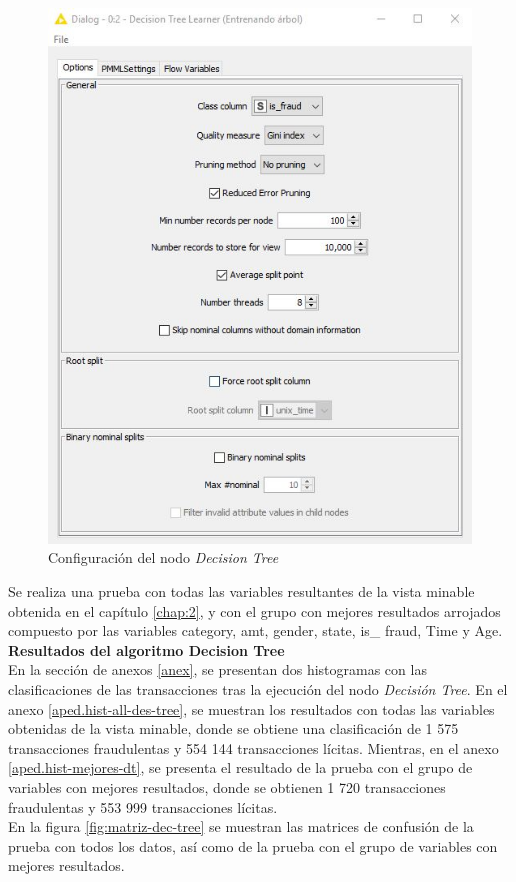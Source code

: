 \begin{figure}[H]
	\centering
	\includegraphics[width=0.37\linewidth]{figuras/Ray/Arbol de decision/Configuracion del nodo Decision Tree}
	\caption{Configuración del nodo \textit{Decision Tree}}
	\label{fig:config-decision-tree}
\end{figure}

Se realiza una prueba con todas las variables resultantes de la vista minable obtenida en el capítulo \ref{chap:2}, y con el grupo con mejores resultados arrojados compuesto por las variables \textsf{category, amt, gender, state, is\_ fraud, Time y Age}. \\

\textbf{Resultados del algoritmo Decision Tree} \\
En la sección de anexos \ref{anex}, se presentan dos histogramas con las clasificaciones de las transacciones tras la ejecución del nodo \textit{Decisión Tree}. En el anexo \ref{aped.hist-all-des-tree}, se muestran los resultados con todas las variables obtenidas de la vista minable, donde se obtiene una clasificación de 1 575 transacciones fraudulentas y 554 144 transacciones lícitas. Mientras, en el anexo \ref{aped.hist-mejores-dt}, se presenta el resultado de la prueba con el grupo de variables con mejores resultados, donde se obtienen 1 720 transacciones fraudulentas y 553 999 transacciones lícitas. \\
En la figura \ref{fig:matriz-dec-tree} se muestran las matrices de confusión de la prueba con todos los datos, así como de la prueba con el grupo de variables con mejores resultados.

